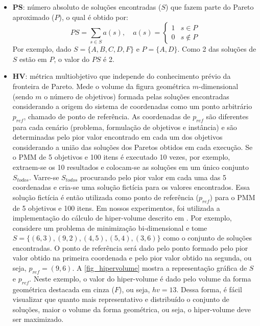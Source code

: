 \begin{itemize}
	\item \textbf{\ac{PS}}: número absoluto de soluções encontradas ($S$) que fazem parte do Pareto aproximado ($P$), o qual é obtido por:
	\begin{equation}
		PS = \sum\limits_{s \in S} a(s), \quad
		a(s) = 
		\begin{cases} 
			1 & s \in P \\
			0 & s \notin P
		\end{cases}
	\end{equation}
	Por exemplo, dado $S=\{A, B, C, D, F\}$ e $P=\{A,D\}$. Como 2 das soluções de $S$ estão em $P$, o valor do $PS$ é 2.
	\item \textbf{\ac{HV}}: métrica multiobjetivo que independe do conhecimento prévio da fronteira de Pareto. Mede o volume da figura geométrica $m$-dimensional (sendo $m$ o número de objetivos) formada pelas soluções encontradas considerando a origem do sistema de coordenadas como um ponto arbitrário $p_{ref}$, chamado de ponto de referência. As coordenadas de $p_{ref}$ são diferentes para cada cenário (problema, formulação de objetivos e instância) e são determinadas pelo pior valor encontrado em cada um dos objetivos considerando a união das soluções dos Paretos obtidos em cada execução. Se o PMM de 5 objetivos e 100 itens é executado 10 vezes, por exemplo, extraem-se os 10 resultados e colocam-se as soluções em um único conjunto $S_{todos}$. Varre-se $S_{todos}$ procurando pelo pior valor em cada uma das 5 coordenadas e cria-se uma solução fictícia para os valores encontrados. Essa solução fictícia é então utilizada como ponto de referência ($p_{ref}$) para o PMM de 5 objetivos e 100 itens. Em nossos experimentos, foi utilizada a implementação do cálculo de hiper-volume descrito em .
	Por exemplo, considere um problema de minimização bi-dimensional e tome $S=\{(6,3), (9,2), (4,5), (5,4), (3,6)\}$ como o conjunto de soluções encontradas. O ponto de referência será dado pelo ponto formado pelo pior valor obtido na primeira coordenada e pelo pior valor obtido na segunda, ou seja, $p_{ref}=(9,6)$. A \autoref{fig_hipervolume} mostra a representação gráfica de $S$ e $p_{ref}$. Neste exemplo, o valor do hiper-volume é dado pelo volume da forma geométrica destacada em cinza ($F$), ou seja, $hv=13$. Dessa forma, é fácil visualizar que quanto mais representativo e distribuído o conjunto de soluções, maior o volume da forma geométrica, ou seja, o hiper-volume deve ser maximizado.
	\begin{figure}[!htbp]
		\centering

\end{figure}
\end{itemize}
